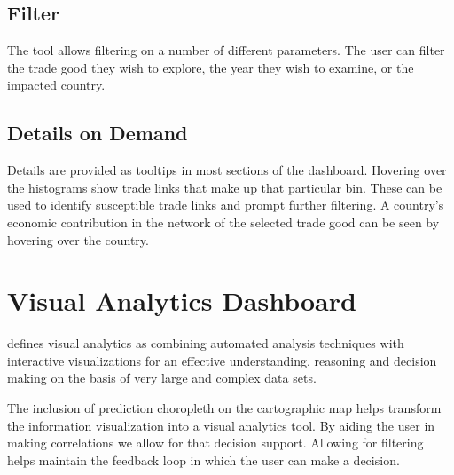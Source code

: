 \subsection{Filter}
The tool allows filtering on a number of different parameters. The user can filter the trade good they wish to explore, the year they wish to examine, or the impacted country.
\subsection{Details on Demand}
Details are provided as tooltips in most sections of the dashboard. Hovering over the histograms show trade links that make up that particular bin. These can be used to identify susceptible trade links and prompt further filtering. A country's economic contribution in the network of the selected trade good can be seen by hovering over the country.
\section{Visual Analytics Dashboard}
\cite{keim2008visual} defines visual analytics as combining automated analysis techniques with interactive visualizations for an effective understanding, reasoning and decision making on the basis of very large and complex data sets.\par
The inclusion of prediction choropleth on the cartographic map helps transform the information visualization into a visual analytics tool. By aiding the user in making correlations we allow for that decision support. Allowing for filtering helps maintain the feedback loop \citep{keim2008visual} in which the user can make a decision.
